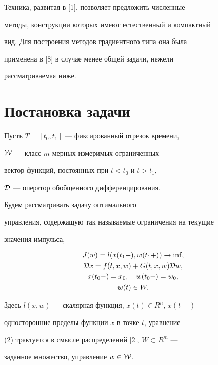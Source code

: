 Техника, развитая в [1], позволяет предложить численные


методы, конструкции которых имеют естественный и компактный


вид. Для построения методов градиентного типа она была


применена в [8] в случае менее общей задачи, нежели 


рассматриваемая ниже.





\section{Постановка задачи}





Пусть $T=[t_0,t_1]$ --- фиксированный отрезок времени,


$\cal W$ --- класс $m$-мерных измеримых ограниченных 


вектор-функций, постоянных при $t<t_0$ и $t>t_1$,


$\cal D$ --- оператор обобщенного дифференцирования.





Будем рассматривать задачу оптимального 


управления, содержащую так называемые ограничения на текущие


значения импульса,


\begin{gather}


J(w)=l(x(t_1+),w(t_1+)) \to \inf,\\


{\cal D} x=f(t,x,w)+G(t,x,w){\cal D}w,\\


x(t_0-)=x_0, \quad w(t_0-)=w_0,\\


w(t) \in W.


\end{gather}


Здесь $l(x,w)$ --- скалярная функция, $x(t)\in R^n$, $x(t\pm)$ ---


односторонние пределы функции $x$ в точке $t$, уравнение


(2) трактуется в смысле распределений [2], $W \subset R^m$ --- 


заданное множество, управление $w \in {\cal W}$.





